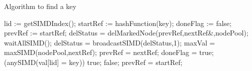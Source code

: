 \documentclass[11pt,onecolumn,draftcls]{IEEEtran}
\begin{document}
\begin{algorithm}
  \caption{Algorithm to find a key}
  \label{alg:find}
  \begin{algorithmic}[1]
       \State lid := getSIMDIndex();
       \State startRef := hashFunction(key);
       \State doneFlag := false;
          \State prevRef := startRef;
             \State delStatus = delMarkedNode(prevRef,nextRef\&,nodePool);
          \EndIf
          \State waitAllSIMD();
          \State delStatus = broadcastSIMD(delStatus,1);
             \State maxVal = maxSIMD(nodePool,nextRef);
                \State prevRef = nextRef;
             \Else
                \State doneFlag = true;
                \If(anySIMD(val[lid] = key))
                   \Return true;
                \Else
                   \Return false;   
                \EndIf   
             \EndIf
          \Else
             \State prevRef = startRef;   
          \EndIf
       \EndWhile
    \EndFunction
  \end{algorithmic}
\end{algorithm}

%


\end{document}
